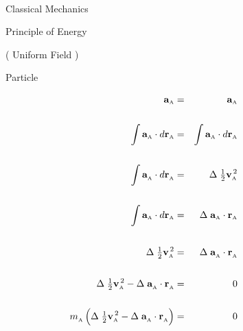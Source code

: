 \documentclass[12pt]{article}
\newcommand{\mM}{m}
\newcommand{\dos}{^{\,2}}
\newcommand{\vR}{\mathbf{r}}
\newcommand{\vV}{\mathbf{v}}
\newcommand{\vA}{\mathbf{a}}
\newcommand{\ra}{_{\scriptscriptstyle \mathrm A}}
\begin{document}
\pagestyle{empty}

\begin{center}

\ \vspace{-0.3em}

{\fontsize{24}{24}\selectfont Classical Mechanics}

\bigskip \bigskip

{\fontsize{15}{15}\selectfont Principle of Energy}

\bigskip \bigskip

{\fontsize{13}{13}\selectfont ( Uniform Field )}

\bigskip \bigskip

{\fontsize{14}{14}\selectfont Particle}

\end{center}

\vspace{-0.6em}

\begin{eqnarray*}
\hspace{-5.19em}\vA\ra & = & \vA\ra \\ \\
\hspace{-5.19em}\int \vA\ra \cdot d\vR\ra & = & \int \vA\ra \cdot d\vR\ra \\ \\
\hspace{-5.19em}\int \vA\ra^{\vphantom{\dos}} \cdot d\vR\ra^{\vphantom{\dos}} & = & \Delta \; {\textstyle \frac{1}{2}}\vV\ra\dos \\ \\
\hspace{-5.19em}\int \vA\ra \cdot d\vR\ra & = & \Delta \; \vA\ra \cdot \vR\ra \\ \\
\hspace{-5.19em}\Delta \; {\textstyle \frac{1}{2}}\vV\ra\dos & = & \Delta \; \vA\ra^{\vphantom{\dos}} \cdot \vR\ra^{\vphantom{\dos}} \\ \\
\hspace{-5.19em}\Delta \; {\textstyle \frac{1}{2}}\vV\ra\dos - \Delta \; \vA\ra^{\vphantom{\dos}} \cdot \vR\ra^{\vphantom{\dos}} & = & 0 \\ \\
\hspace{-5.19em}\mM\ra^{\vphantom{\dos}} \left( \Delta \; {\textstyle \frac{1}{2}}\vV\ra\dos - \Delta \; \vA\ra^{\vphantom{\dos}} \cdot \vR\ra^{\vphantom{\dos}} \right) & = & 0
\end{eqnarray*}
\end{document}

